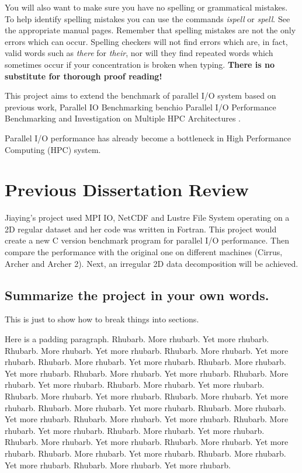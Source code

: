 \documentclass{article}
\begin{document}
You will also want to make sure you have no spelling or grammatical
mistakes. To help identify spelling mistakes you can use the commands
{\em ispell} or {\em spell}. See the appropriate manual pages. Remember
that spelling mistakes are not the only errors which can occur. Spelling
checkers will not find errors which are, in fact, valid words such as
{\em there} for {\em their}, nor will they find repeated words which
sometimes occur if your concentration is broken when typing. {\bf There
is no substitute for thorough proof reading!}



This project aims to extend the benchmark of parallel I/O system based on previous work, Parallel IO Benchmarking \cite{ref:lam} benchio \cite{ref:lam} Parallel I/O Performance Benchmarking and Investigation on Multiple HPC Architectures \cite{ref:lam}. 


Parallel I/O performance has already become a bottleneck in High Performance Computing (HPC) system.







\section{Previous Dissertation Review}


Jiaying's project used MPI IO, NetCDF and Lustre File System operating on a 2D regular dataset and her code was written in Fortran. This project would create a new C version benchmark program for parallel I/O performance. Then compare the performance with the original one on different machines (Cirrus, Archer and Archer 2). Next, an irregular 2D data decomposition will be achieved.

\subsection*{Summarize the project in your own words.}

This is just to show how to break things into sections.

Here is a padding paragraph.  Rhubarb.  More rhubarb.  Yet more rhubarb. 
Rhubarb.  More rhubarb.  Yet more rhubarb.  Rhubarb.  More rhubarb.  Yet
more rhubarb.  Rhubarb.  More rhubarb.  Yet more rhubarb.  Rhubarb. 
More rhubarb.  Yet more rhubarb.  Rhubarb.  More rhubarb.  Yet more
rhubarb.  Rhubarb.  More rhubarb.  Yet more rhubarb.  Rhubarb.  More
rhubarb.  Yet more rhubarb.  Rhubarb.  More rhubarb.  Yet more rhubarb. 
Rhubarb.  More rhubarb.  Yet more rhubarb.  Rhubarb.  More rhubarb.  Yet
more rhubarb.  Rhubarb.  More rhubarb.  Yet more rhubarb.  Rhubarb. 
More rhubarb.  Yet more rhubarb.  Rhubarb.  More rhubarb.  Yet more
rhubarb.  Rhubarb.  More rhubarb.  Yet more rhubarb.   Rhubarb.  More
rhubarb.  Yet more rhubarb.   Rhubarb.  More rhubarb.  Yet more
rhubarb.  Rhubarb.  More rhubarb.  Yet more rhubarb.    Rhubarb.  More
rhubarb.  Yet more rhubarb.  Rhubarb.  More rhubarb.  Yet more rhubarb. 
\end{document}
